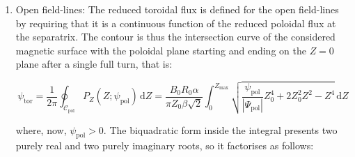 \begin{enumerate}
    where $F(\phi,k)$ is the incomplete elliptic integral of the first kind. Imposing the condition that $\theta(Z=Z_\text{min})=\pi$, we find an expression for the safety factor:

    \begin{equation}
        q(\psi_\text{pol})=\left(\frac{\mathrm{d}\psi_\text{pol}}{\mathrm{d}\psi_\text{tor}}\right)^{-1}=\frac{B_0R_0}{\pi\alpha\beta}K\left(k\right)\sqrt{2-k^2}
    \end{equation}

    which, by inverting relation (\ref{eq-5-212}), gives the field-line coordinates $Z(\theta)$, $R(\theta)$ as follows:

    \begin{equation*}
        Z(\theta)=Z_\text{max}\,\mathrm{dn}(K(k)\theta/\pi;k)\quad\text{and}
    \end{equation*}
    
    \begin{equation}
        R(\theta)=R_0\exp{\left[-\frac{Z_0\sqrt{2}\alpha}{\beta}\sqrt{1+\frac{\psi_\text{pol}}{|\Psi_\text{pol}|}}\mathrm{sn}(K(k)\theta/\pi;k)\,\mathrm{cn}(K(k)\theta/\pi;k)\right]}
    \end{equation}

    where $k$ retains its meaning, while $\mathrm{sn}(u;k)$, $\mathrm{cn}(u;k)$, and $\mathrm{dn}(u;k)$ denote the Jacobi elliptic sine, elliptic cosine, and the delta amplitude functions. The dependence on $\varphi$ is found via the rotational transform.

    \item Open field-lines: The reduced toroidal flux is defined for the open field-lines by requiring that it is a continuous function of the reduced poloidal flux at the separatrix. The contour is thus the intersection curve of the considered magnetic surface with the poloidal plane starting and ending on the $Z=0$ plane after a single full turn, that is:

    \begin{equation}
        \psi_\text{tor}=\frac{1}{2\pi}\oint_{\mathcal{C}_\text{pol}}P_Z(Z;\psi_\text{pol})\,\text{d}Z=\frac{B_0R_0\alpha}{\pi Z_0\beta\sqrt{2}}\int_0^{Z_\text{max}}\sqrt{\frac{\psi_\text{pol}}{|\Psi_\text{pol}|}Z_0^4+2Z_0^2Z^2-Z^4}\,\mathrm{d}Z
    \end{equation}

    where, now, $\psi_\text{pol}>0$. The biquadratic form inside the integral presents two purely real and two purely imaginary roots, so it factorises as follows:


\end{enumerate}

